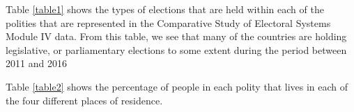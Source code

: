 \documentclass[12pt, titlepage]{article}
\begin{document}

Table \ref{table1} shows the types of elections that are held within each of the polities that are represented in the Comparative Study of Electoral Systems Module IV data. From this table, we see that many of the countries are holding legislative, or parliamentary elections to some extent during the period between 2011 and 2016


Table \ref{table2} shows the percentage of people in each polity that lives in each of the four different places of residence. 
\end{document}
